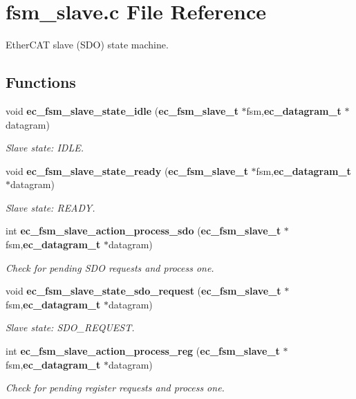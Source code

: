 \section{fsm\-\_\-slave.\-c File Reference}
\label{fsm__slave_8c}


Ether\-C\-A\-T slave (S\-D\-O) state machine.  


\subsection*{Functions}
\begin{DoxyCompactItemize}
\item 
void {\bf ec\-\_\-fsm\-\_\-slave\-\_\-state\-\_\-idle} ({\bf ec\-\_\-fsm\-\_\-slave\-\_\-t} $\ast$fsm,{\bf ec\-\_\-datagram\-\_\-t} $\ast$datagram)
\begin{DoxyCompactList}\small\item\em Slave state\-: I\-D\-L\-E. \end{DoxyCompactList}\item 
void {\bf ec\-\_\-fsm\-\_\-slave\-\_\-state\-\_\-ready} ({\bf ec\-\_\-fsm\-\_\-slave\-\_\-t} $\ast$fsm,{\bf ec\-\_\-datagram\-\_\-t} $\ast$datagram)
\begin{DoxyCompactList}\small\item\em Slave state\-: R\-E\-A\-D\-Y. \end{DoxyCompactList}\item 
int {\bf ec\-\_\-fsm\-\_\-slave\-\_\-action\-\_\-process\-\_\-sdo} ({\bf ec\-\_\-fsm\-\_\-slave\-\_\-t} $\ast$fsm,{\bf ec\-\_\-datagram\-\_\-t} $\ast$datagram)
\begin{DoxyCompactList}\small\item\em Check for pending S\-D\-O requests and process one. \end{DoxyCompactList}\item 
void {\bf ec\-\_\-fsm\-\_\-slave\-\_\-state\-\_\-sdo\-\_\-request} ({\bf ec\-\_\-fsm\-\_\-slave\-\_\-t} $\ast$fsm,{\bf ec\-\_\-datagram\-\_\-t} $\ast$datagram)
\begin{DoxyCompactList}\small\item\em Slave state\-: S\-D\-O\-\_\-\-R\-E\-Q\-U\-E\-S\-T. \end{DoxyCompactList}\item 
int {\bf ec\-\_\-fsm\-\_\-slave\-\_\-action\-\_\-process\-\_\-reg} ({\bf ec\-\_\-fsm\-\_\-slave\-\_\-t} $\ast$fsm,{\bf ec\-\_\-datagram\-\_\-t} $\ast$datagram)
\begin{DoxyCompactList}\small\item\em Check for pending register requests and process one. \end{DoxyCompactList}\item 

\end{DoxyCompactItemize}
